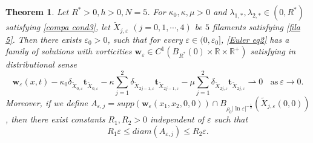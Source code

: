 \documentclass[12pt,reqno]{amsart}
\numberwithin{equation}{section}
\newtheorem{theorem}{Theorem}[section]
\theoremstyle{definition}
\theoremstyle{remark}
\begin{document}
\begin{theorem}\label{thm05}
	Let $ R^*>0, h>0, N=5 $. For $ \kappa_0,\kappa,\mu>0 $ and $ \lambda_{1,*},\lambda_{2,*}\in(0,R^*) $ satisfying \eqref{compa cond3}, %
let $ \tilde{X}_{j,\varepsilon} $ $(j=0,1,\cdots,4)$ be $ 5 $ filaments satisfying \eqref{fila 5}. Then  there exists $ \varepsilon_0>0 $, such that for every $ \varepsilon\in(0,\varepsilon_0] $, \eqref{Euler eq2} has a family of solutions with vorticities $ \mathbf{w}_\varepsilon\in C^1(B_{R^*}(0)\times \mathbb{R}\times\mathbb{R}^+) $ satisfying in distributional sense
	\begin{equation*} 
	\mathbf{w}_\varepsilon(x,t)- \kappa_0\delta_{\tilde{X}_{0,\varepsilon}}\textbf{t}_{\tilde{X}_{0,\varepsilon}}- \kappa\sum_{j=1}^2\delta_{\tilde{X}_{2j-1,\varepsilon}}\textbf{t}_{\tilde{X}_{2j-1,\varepsilon}}-\mu\sum_{j=1}^2\delta_{\tilde{X}_{2j,\varepsilon}}\textbf{t}_{\tilde{X}_{2j,\varepsilon}}\rightharpoonup0\ \ \ \ \text{as}\ \varepsilon\to0.
	\end{equation*}
	Moreover, if we define   $ A_{\varepsilon,j}=supp\left (\mathbf{w}_\varepsilon(x_1,x_2,0,0)\right ) \cap B_{\rho_0|\ln\varepsilon|^{-\frac{1}{2}}}\left ( \tilde{X}_{j,\varepsilon}(0,0)\right )  $, then there exist constants $ R_1,R_2>0 $ independent of $ \varepsilon $  such that
	\begin{equation*}
	R_1\varepsilon \leq diam(A_{\varepsilon,j})\leq R_2\varepsilon .
	\end{equation*}
\end{theorem}
\end{document}
